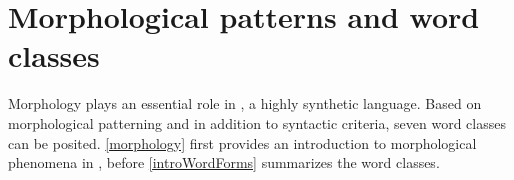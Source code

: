 


\chapter{Morphological patterns and word classes}\label{morphWordClassCh}
Morphology plays an essential role in \PS, a highly synthetic language. Based on morphological patterning and in addition to syntactic criteria, seven word classes can be posited. \SEC\ref{morphology} first provides an introduction to morphological phenomena in \PS, before \SEC\ref{introWordForms} summarizes the word classes.  


